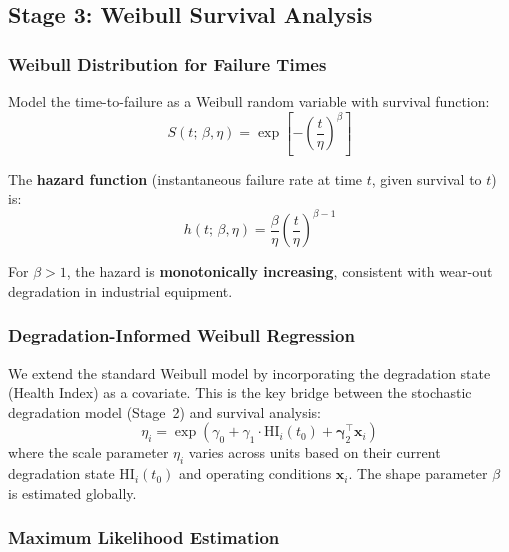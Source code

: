 \documentclass[12pt, a4paper]{article}
\newcommand{\HI}{\mathrm{HI}}
\begin{document}
\subsection{Stage 3: Weibull Survival Analysis}

\subsubsection{Weibull Distribution for Failure Times}

Model the time-to-failure as a Weibull random variable with survival function:
\begin{equation}\label{eq:weibull-surv}
    S(t;\,\beta,\eta) = \exp\!\left[-\left(\frac{t}{\eta}\right)^{\!\beta}\right]
\end{equation}

The \textbf{hazard function} (instantaneous failure rate at time $t$, given survival to $t$) is:
\begin{equation}\label{eq:weibull-hazard}
    h(t;\,\beta,\eta) = \frac{\beta}{\eta}\left(\frac{t}{\eta}\right)^{\!\beta-1}
\end{equation}

For $\beta > 1$, the hazard is \textbf{monotonically increasing}, consistent with wear-out degradation in industrial equipment.

\subsubsection{Degradation-Informed Weibull Regression}

We extend the standard Weibull model by incorporating the degradation state (Health Index) as a covariate. This is the key bridge between the stochastic degradation model (Stage~2) and survival analysis:
\begin{equation}\label{eq:weibull-reg}
    \eta_i = \exp\!\left(\gamma_0 + \gamma_1 \cdot \HI_i(t_0) + \boldsymbol{\gamma}_2^\top \mathbf{x}_i\right)
\end{equation}
where the scale parameter $\eta_i$ varies across units based on their current degradation state $\HI_i(t_0)$ and operating conditions $\mathbf{x}_i$. The shape parameter $\beta$ is estimated globally.

\subsubsection{Maximum Likelihood Estimation}
\end{document}
